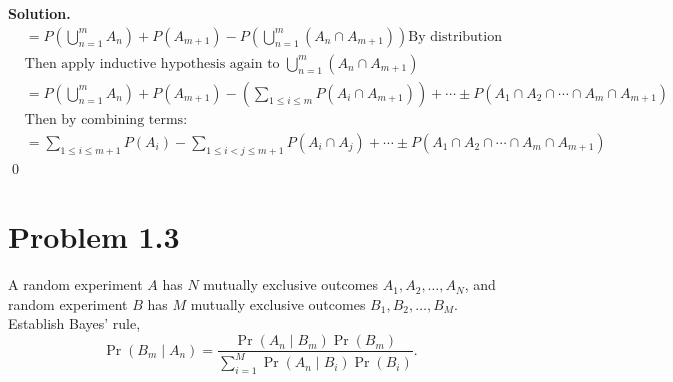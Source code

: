 \documentclass[11pt]{article}
\newenvironment{solution}{\par\noindent\textbf{Solution.}\ }{\par\vspace{6pt}}
\begin{document}
\begin{solution}
\begin{align}
            &= P\left(\bigcup_{n=1}^{m} A_n\right) + P(A_{m + 1}) - P\left(\bigcup_{n=1}^{m} \left(A_n \cap A_{m + 1}\right)\right) \text{By distribution} \\
            &\text{Then apply inductive hypothesis again to $\bigcup_{n=1}^{m} \left(A_n \cap A_{m + 1}\right)$} \\
            &= P\left(\bigcup_{n=1}^{m} A_n\right) + P(A_{m + 1}) - (\sum_{1 \le i \le m} P(A_i \cap A_{m + 1})) + \cdots \pm P(A_1 \cap A_2 \cap \cdots \cap A_m \cap A_{m+1}) \\
            &\text{Then by combining terms:} \\
            &= \sum_{1 \le i \le m+1} P(A_i) - \sum_{1 \le i < j \le m+1} P(A_i \cap A_j) + \cdots \pm P(A_1 \cap A_2 \cap \cdots \cap A_m \cap A_{m+1})
        \end{align}
        \qed
    \end{solution}

    \newpage
    \section*{Problem 1.3}

    A random experiment $A$ has $N$ mutually exclusive outcomes $A_1, A_2, \ldots, A_N$, and random experiment $B$ has $M$ mutually exclusive outcomes $B_1, B_2, \ldots, B_M$. Establish Bayes' rule,
    \[
        \Pr(B_m \mid A_n) = \frac{\Pr(A_n \mid B_m)\Pr(B_m)}{\sum_{i=1}^{M} \Pr(A_n \mid B_i)\Pr(B_i)}.
    \]
\end{document}
